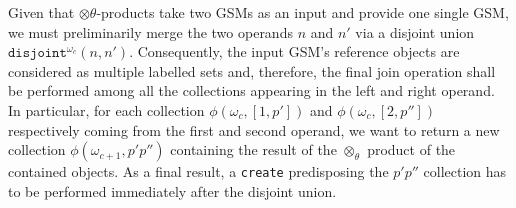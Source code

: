 \label{def:otimesthetaList} 
Given that $\otimes\theta$-products take two GSMs as an input and provide one single GSM, we must 
preliminarily merge the two operands $n$ and $n'$ via a disjoint union $\texttt{disjoint}^{\omega_c}(n, n')$. Consequently, the input GSM's reference objects are considered as multiple labelled sets and, therefore, the final join operation shall be performed among all the collections appearing in the left and right  operand. In particular, for each collection $\phi(\omega_c,[1,p'])$ and $\phi(\omega_c,[2,p''])$ respectively coming from the first and second operand, we want to return a new collection $\phi(\omega_{c+1},p'p'')$ containing the result of the $\otimes_\theta$ product of the contained objects. As a final result, a \texttt{create} predisposing the $p'p''$ collection has to be performed immediately after the disjoint union.%

